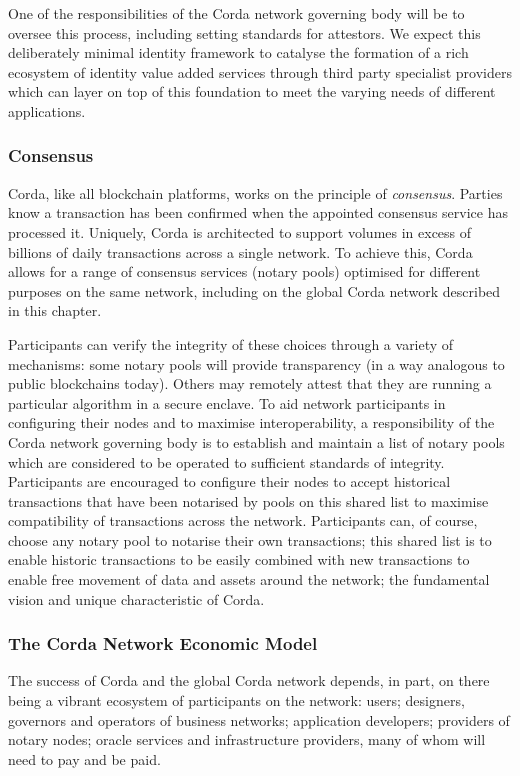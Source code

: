 \documentclass{article}
\begin{document}
One of the responsibilities of the Corda network governing body will be to oversee this process, including setting standards for attestors. We expect this deliberately minimal identity framework to catalyse the formation of a rich ecosystem of identity value added services through third party specialist providers which can layer on top of this foundation to meet the varying needs of different applications.

\subsubsection{Consensus}

Corda, like all blockchain platforms, works on the principle of \textit{consensus}. Parties know a transaction has been confirmed when the appointed consensus service has processed it. Uniquely, Corda is architected to support volumes in excess of billions of daily transactions across a single network. To achieve this, Corda allows for a range of consensus services (notary pools) optimised for different purposes on the same network, including on the global Corda network described in this chapter.

Participants can verify the integrity of these choices through a variety of mechanisms: some notary pools will provide transparency (in a way analogous to public blockchains today). Others may remotely attest that they are running a particular algorithm in a secure enclave. To aid network participants in configuring their nodes and to maximise interoperability, a responsibility of the Corda network governing body is to establish and maintain a list of notary pools which are considered to be operated to sufficient standards of integrity. Participants are encouraged to configure their nodes to accept historical transactions that have been notarised by pools on this shared list to maximise compatibility of transactions across the network. Participants can, of course, choose any notary pool to notarise their own transactions; this shared list is to enable historic transactions to be easily combined with new transactions to enable free movement of data and assets around the network; the fundamental vision and unique characteristic of Corda.

\subsubsection {The Corda Network Economic Model}

The success of Corda and the global Corda network depends, in part, on there being a vibrant ecosystem of participants on the network: users; designers, governors and operators of business networks; application developers; providers of notary nodes; oracle services and infrastructure providers, many of whom will need to pay and be paid.
\end{document}
